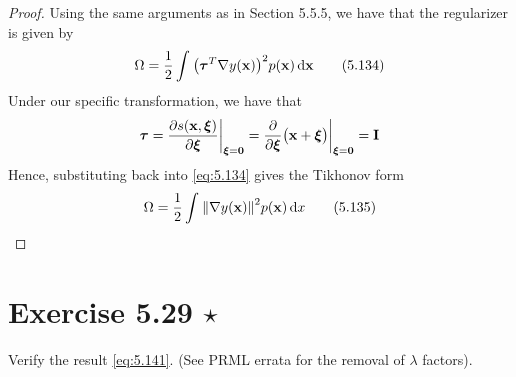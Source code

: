 \vspace{1em}

\begin{proof}
    Using the same arguments as in Section 5.5.5, we have that the regularizer
    is given by
    \begin{equation*}
        \Omega = \frac{1}{2} \int_{}^{} \big(\bm{\tau}^T 
        \nabla y(\mathbf{x})\big)^2 p(\mathbf{x}) \mathop{}\!\mathrm{d} \mathbf{x}
        \tag{5.134}\label{eq:5.134}
    \end{equation*}
    Under our specific transformation, we have that
    \[
        \bm{\tau} = \pdv{s(\mathbf{x}, \bm{\xi})}{\bm{\xi}} \bigg|_{\bm{\xi} = \bm{0}}
        = \pdv{\bm{\xi}} \big(\mathbf{x} + \bm{\xi}\big) \bigg|_{\bm{\xi} = \bm{0}}
        = \mathbf{I}
    \] 
    Hence, substituting back into \eqref{eq:5.134} gives the Tikhonov form
    \begin{equation*}
        \Omega = \frac{1}{2} \int_{}^{} \norm{\nabla y(\mathbf{x})}^2 p(\mathbf{x}) \mathop{}\!\mathrm{d} x
        \tag{5.135}\label{eq:5.135}
    \end{equation*}
\end{proof}

\section*{Exercise 5.29 $\star$}
Verify the result \eqref{eq:5.141}. (See PRML errata for the removal of $\lambda$ factors).

\vspace{1em}

